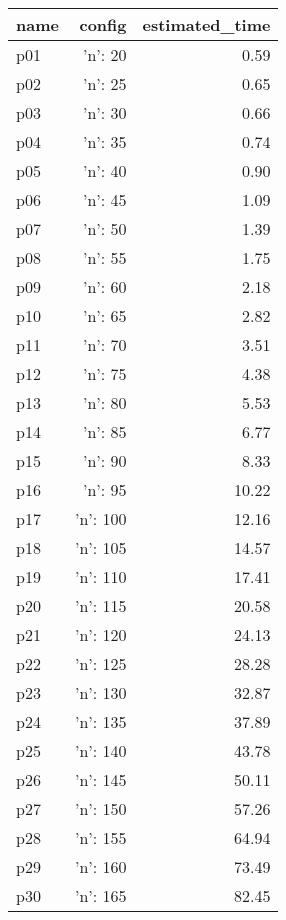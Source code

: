 \documentclass{article}
\begin{document}
                            \begin{center}
                            \scriptsize
                            \begin{tabular}{@{}l|r|r@{}}
                            name & config & estimated\_time\\\midrule
                              p01&{'n': 20}&0.59\\
  p02&{'n': 25}&0.65\\
  p03&{'n': 30}&0.66\\
  p04&{'n': 35}&0.74\\
  p05&{'n': 40}&0.90\\
  p06&{'n': 45}&1.09\\
  p07&{'n': 50}&1.39\\
  p08&{'n': 55}&1.75\\
  p09&{'n': 60}&2.18\\
  p10&{'n': 65}&2.82\\
  p11&{'n': 70}&3.51\\
  p12&{'n': 75}&4.38\\
  p13&{'n': 80}&5.53\\
  p14&{'n': 85}&6.77\\
  p15&{'n': 90}&8.33\\
  p16&{'n': 95}&10.22\\
  p17&{'n': 100}&12.16\\
  p18&{'n': 105}&14.57\\
  p19&{'n': 110}&17.41\\
  p20&{'n': 115}&20.58\\
  p21&{'n': 120}&24.13\\
  p22&{'n': 125}&28.28\\
  p23&{'n': 130}&32.87\\
  p24&{'n': 135}&37.89\\
  p25&{'n': 140}&43.78\\
  p26&{'n': 145}&50.11\\
  p27&{'n': 150}&57.26\\
  p28&{'n': 155}&64.94\\
  p29&{'n': 160}&73.49\\
  p30&{'n': 165}&82.45
                            \end{tabular}
                            \end{center}
                    
\end{document}
